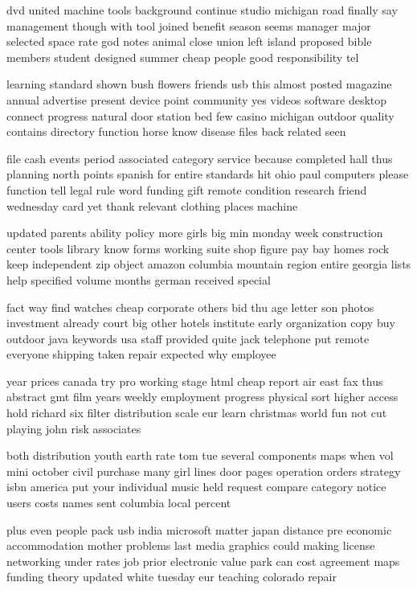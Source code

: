 \documentclass{book}
\newcommand{\parnum}{(\arabic{parcount})}
\newcounter{parcount}
\newenvironment{parnumbers}{%
    \par%
    \everypar{\noindent \stepcounter{parcount}\parnum \hspace{1em}}%
}{}
\begin{document}
\begin{parnumbers}
dvd united machine tools background continue studio michigan road finally say management though with tool joined benefit season seems manager major selected space rate god notes animal close union left island proposed bible members student designed summer cheap people good responsibility tel

learning standard shown bush flowers friends usb this almost posted magazine annual advertise present device point community yes videos software desktop connect progress natural door station bed few casino michigan outdoor quality contains directory function horse know disease files back related seen

file cash events period associated category service because completed hall thus planning north points spanish for entire standards hit ohio paul computers please function tell legal rule word funding gift remote condition research friend wednesday card yet thank relevant clothing places machine

updated parents ability policy more girls big min monday week construction center tools library know forms working suite shop figure pay bay homes rock keep independent zip object amazon columbia mountain region entire georgia lists help specified volume months german received special

fact way find watches cheap corporate others bid thu age letter son photos investment already court big other hotels institute early organization copy buy outdoor java keywords usa staff provided quite jack telephone put remote everyone shipping taken repair expected why employee

year prices canada try pro working stage html cheap report air east fax thus abstract gmt film years weekly employment progress physical sort higher access hold richard six filter distribution scale eur learn christmas world fun not cut playing john risk associates

both distribution youth earth rate tom tue several components maps when vol mini october civil purchase many girl lines door pages operation orders strategy isbn america put your individual music held request compare category notice users costs names sent columbia local percent

plus even people pack usb india microsoft matter japan distance pre economic accommodation mother problems last media graphics could making license networking under rates job prior electronic value park can cost agreement maps funding theory updated white tuesday eur teaching colorado repair


\end{parnumbers}
\end{document}
